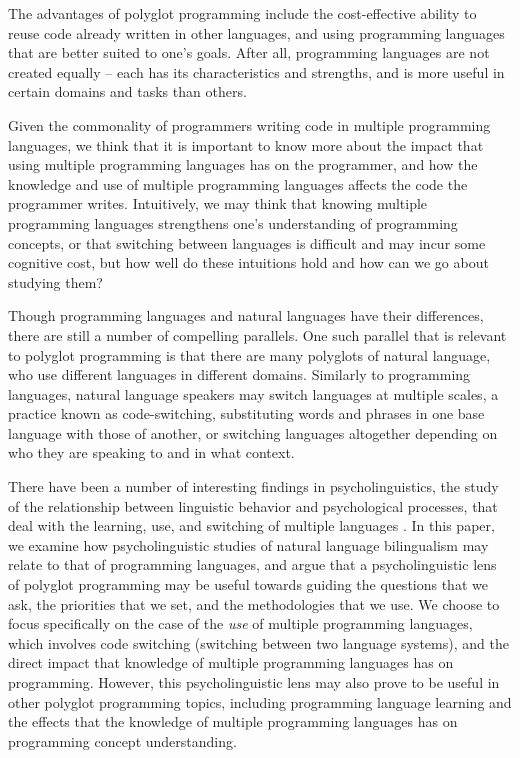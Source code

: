 \documentclass[a4paper,UKenglish,cleveref, autoref]{oasics-v2019}
\begin{document}
The advantages of polyglot programming include the cost-effective ability to reuse code already written in other languages, and using programming languages that are better suited to one’s goals. After all, programming languages are not created equally -- each has its characteristics and strengths, and is more useful in certain domains and tasks than others. 

Given the commonality of programmers writing code in multiple programming languages, we think that it is important to know more about the impact that using multiple programming languages has on the programmer, and how the knowledge and use of multiple programming languages affects the code the programmer writes. Intuitively, we may think that knowing multiple programming languages strengthens one’s understanding of programming concepts, or that switching between languages is difficult and may incur some cognitive cost, but how well do these intuitions hold and how can we go about studying them? 

Though programming languages and natural languages have their differences, there are still a number of compelling parallels. One such parallel that is relevant to polyglot programming is that there are many polyglots of natural language, who use different languages in different domains. Similarly to programming languages, natural language speakers may switch languages at multiple scales, a practice known as code-switching, substituting words and phrases in one base language with those of another, or switching languages altogether depending on who they are speaking to and in what context. 

There have been a number of interesting findings in psycholinguistics, the study of the relationship between linguistic behavior and psychological processes, that deal with the learning, use, and switching of multiple languages \cite{pl0034, pl0046, pl0011}. In this paper, we examine how psycholinguistic studies of natural language bilingualism may relate to that of programming languages, and argue that a psycholinguistic lens of polyglot programming may be useful towards guiding the questions that we ask, the priorities that we set, and the methodologies that we use. We choose to focus specifically on the case of the \textit{use} of multiple programming languages, which involves code switching (switching between two language systems), and the direct impact that knowledge of multiple programming languages has on programming. However, this psycholinguistic lens may also prove to be useful in other polyglot programming topics, including programming language learning and the effects that the knowledge of multiple programming languages has on programming concept understanding. 
\end{document}
